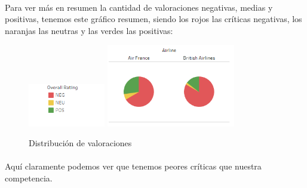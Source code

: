 \documentclass{report}
\begin{document}
            \paragraph*{}{
            Para ver más en resumen la cantidad de valoraciones negativas, medias y positivas, tenemos este gráfico resumen, siendo los rojos las críticas negativas, los naranjas las neutras y las verdes las positivas:
            }
            \begin{figure}[H]
                \centering
                \includegraphics[width=0.3\textwidth]{img/Guion2.png}
                \includegraphics[width=0.5\textwidth]{img/Quesitos.png}
                \caption{Distribución de valoraciones}
            \end{figure}
            
            \paragraph*{}{
            Aquí claramente podemos ver que tenemos peores críticas que nuestra competencia.
            }
\end{document}
